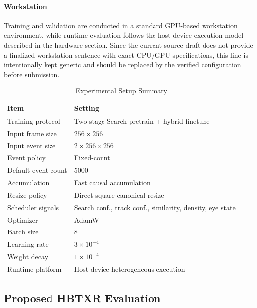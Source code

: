 \documentclass[journal]{IEEEtran}
\begin{document}
\paragraph*{Workstation}
Training and validation are conducted in a standard GPU-based workstation environment, while runtime evaluation follows the host-device execution model described in the hardware section. Since the current source draft does not provide a finalized workstation sentence with exact CPU/GPU specifications, this line is intentionally kept generic and should be replaced by the verified configuration before submission.

\begin{table}[t]
\caption{Experimental Setup Summary}
\label{tab:setup}
\centering
\footnotesize
\begin{tabular}{p{}p{}}
\toprule
Item & Setting \\
\midrule
Training protocol & Two-stage Search pretrain + hybrid finetune \\
Input frame size & $256\times256$ \\
Input event size & $2\times256\times256$ \\
Event policy & Fixed-count \\
Default event count & 5000 \\
Accumulation & Fast causal accumulation \\
Resize policy & Direct square canonical resize \\
Scheduler signals & Search conf., track conf., similarity, density, eye state \\
Optimizer & AdamW \\
Batch size & 8 \\
Learning rate & $3\times10^{-4}$ \\
Weight decay & $1\times10^{-4}$ \\
Runtime platform & Host-device heterogeneous execution \\
\bottomrule
\end{tabular}
\end{table}

\subsection{Proposed HBTXR Evaluation}
\end{document}
